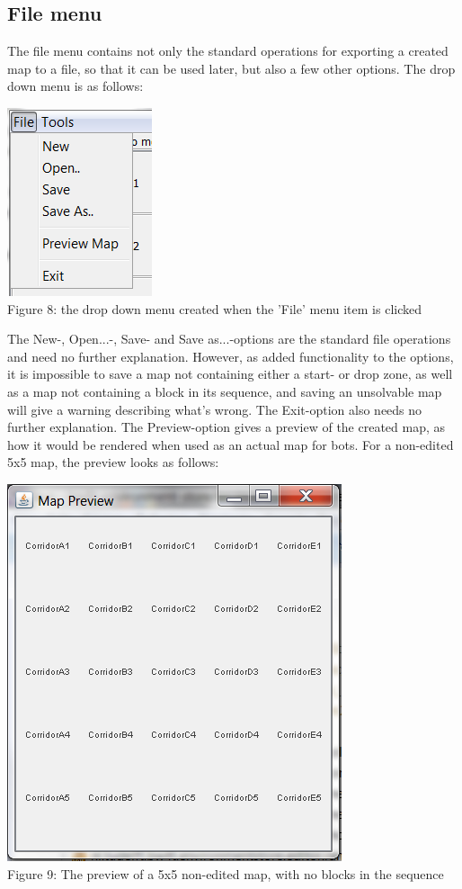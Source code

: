 \subsection{File menu}
The file menu contains not only the standard operations for exporting a created map to a file, so that it can be used later, but also a few other options. The drop down menu is as follows:
\begin{center}
	\centering
	\includegraphics{EnvironmentStore/DropDownFile.png}\\
	Figure 8: the drop down menu created when the 'File' menu item is clicked
\end{center}
The New-, Open...-, Save- and Save as...-options are the standard file operations and need no further explanation. However, as added functionality to the options, it is impossible to save a map not containing either a start- or drop zone, as well as a map not containing a block in its sequence, and saving an unsolvable map will give a warning describing what's wrong. The Exit-option also needs no further explanation. The Preview-option gives a preview of the created map, as how it would be rendered when used as an actual map for bots. For a non-edited 5x5 map, the preview looks as follows:
\begin{center}
	\centering
	\includegraphics{EnvironmentStore/Preview.png}\\
	Figure 9: The preview of a 5x5 non-edited map, with no blocks in the sequence
\end{center}
